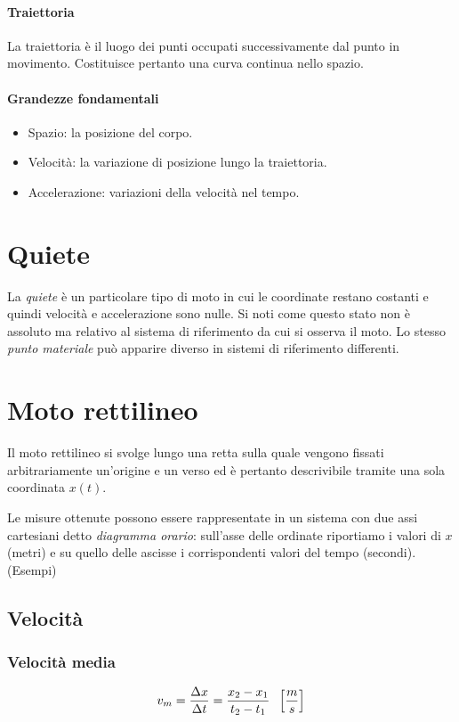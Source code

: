 \documentclass[class=book, crop=false, oneside, 12pt]{standalone}
\begin{document}
      \paragraph{Traiettoria}
      La traiettoria \`e il luogo dei punti occupati successivamente dal punto in movimento.
      Costituisce pertanto una curva continua nello spazio.
      \paragraph{Grandezze fondamentali}
      \begin{itemize}
        \item Spazio: la posizione del corpo.
        \item Velocit\`a: la variazione di posizione lungo la traiettoria.
        \item Accelerazione: variazioni della velocità nel tempo.
      \end{itemize}
\section{Quiete}
La \emph{quiete} è un particolare tipo di moto in cui le coordinate restano costanti e quindi velocità e accelerazione sono nulle.
Si noti come questo stato non \`e assoluto ma relativo al sistema di riferimento da cui si osserva il moto.
Lo stesso \emph{punto materiale} può apparire diverso in sistemi di riferimento differenti.
\section{Moto rettilineo}
Il moto rettilineo si svolge lungo una retta sulla quale vengono fissati arbitrariamente un'origine e un verso ed è pertanto descrivibile tramite una sola coordinata \(x(t)\).

Le misure ottenute possono essere rappresentate in un sistema con due assi cartesiani detto \emph{diagramma orario}: sull'asse delle ordinate riportiamo i valori di \(x\) (metri) e su quello delle ascisse i corrispondenti valori del tempo (secondi).
(Esempi)
  \subsection{Velocità}
    \subsubsection{Velocit\`a media}
    \begin{equation*}
      v_m = \frac {\Delta x} {\Delta t} = \frac {x_2 - x_1} {t_2 - t_1} \hspace{0.2cm} \left[\frac {m} {s}\right]
    \end{equation*}
\end{document}
